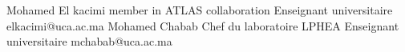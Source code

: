 %
%
%


\begin{referees}
		{Mohamed El kacimi}
		{member in ATLAS collaboration}
		{Enseignant universitaire}
		{elkacimi@uca.ac.ma}
		{}
		{Mohamed Chabab}
		{Chef du laboratoire LPHEA}
		{Enseignant universitaire}
		{mchabab@uca.ac.ma}
		{}
\end{referees}

